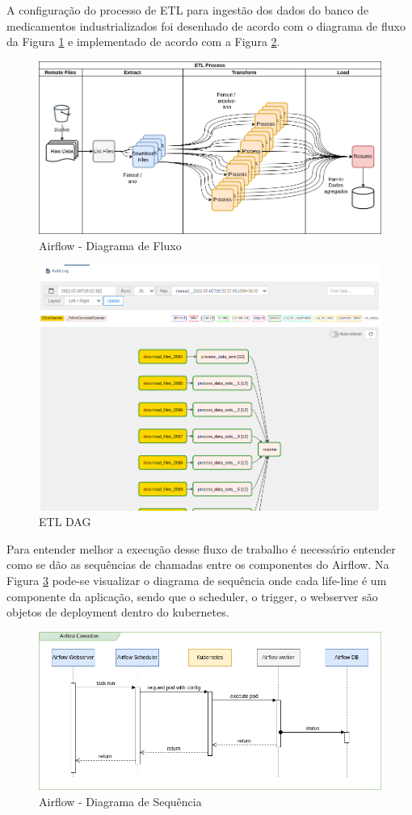 A configuração do processo de ETL para ingestão dos dados do banco de medicamentos industrializados foi desenhado de acordo com o diagrama de fluxo da Figura \ref{fig:diagramafluxo} e implementado  de acordo com a Figura \ref{fig:airflowdag}.

\begin{figure}[!ht]
    \centering
    \includegraphics[width=0.8\linewidth]{04-figuras/flow-7.png}
    \caption{Airflow - Diagrama de Fluxo}
    \label{fig:diagramafluxo}
\end{figure}

\begin{figure}[!ht]
    \centering
    \includegraphics[width=0.8\linewidth]{04-figuras/graph_execution.png}
    \caption{ETL DAG}
    \label{fig:airflowdag}
\end{figure}

Para entender melhor a execução desse fluxo de trabalho é necessário entender como se dão as sequências de chamadas entre os componentes do Airflow. Na Figura \ref{fig:airflowsequence} pode-se visualizar o diagrama de sequência onde cada life-line é um componente da aplicação, sendo que o scheduler, o trigger, o webserver são objetos de deployment dentro do kubernetes.

\begin{figure}[!ht]
    \centering
    \includegraphics[width=0.8\linewidth]{04-figuras/airflow_sequence.png}
    \caption{Airflow - Diagrama de Sequência}
    \label{fig:airflowsequence}
\end{figure}

